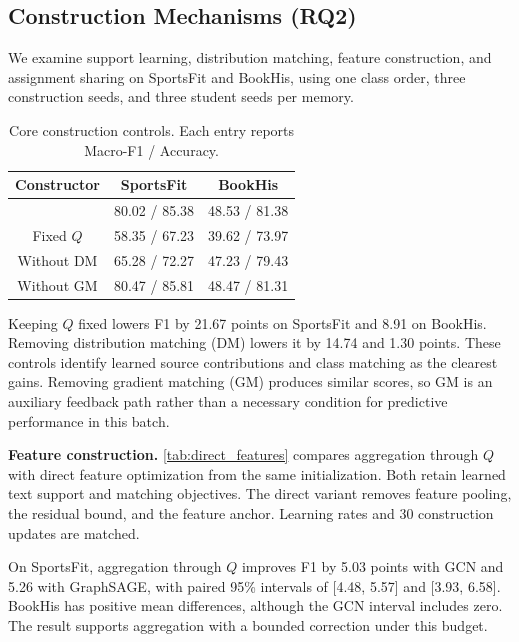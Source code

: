 \subsection{Construction Mechanisms (RQ2)}
\label{sec:ablations}

We examine support learning, distribution matching, feature construction, and assignment sharing on SportsFit and BookHis, using one class order, three construction seeds, and three student seeds per memory.

\begin{table}[t]
\centering
\caption{Core construction controls. Each entry reports Macro-F1 / Accuracy.}
\label{tab:loss_controls}
\begin{tabular}{ccc}
\toprule
Constructor & SportsFit & BookHis\\
\midrule
\method{} & 80.02 / 85.38 & 48.53 / 81.38\\
Fixed \(Q\) & 58.35 / 67.23 & 39.62 / 73.97\\
Without DM & 65.28 / 72.27 & 47.23 / 79.43\\
Without GM & 80.47 / 85.81 & 48.47 / 81.31\\
\bottomrule
\end{tabular}
\end{table}

Keeping \(Q\) fixed lowers F1 by 21.67 points on SportsFit and 8.91 on BookHis. Removing distribution matching (DM) lowers it by 14.74 and 1.30 points. These controls identify learned source contributions and class matching as the clearest gains. Removing gradient matching (GM) produces similar scores, so GM is an auxiliary feedback path rather than a necessary condition for predictive performance in this batch.

\noindent\textbf{Feature construction.}
\autoref{tab:direct_features} compares aggregation through \(Q\) with direct feature optimization from the same initialization. Both retain learned text support and matching objectives. The direct variant removes feature pooling, the residual bound, and the feature anchor. Learning rates and 30 construction updates are matched.

On SportsFit, aggregation through \(Q\) improves F1 by 5.03 points with GCN and 5.26 with GraphSAGE, with paired 95\% intervals of [4.48, 5.57] and [3.93, 6.58]. BookHis has positive mean differences, although the GCN interval includes zero. The result supports aggregation with a bounded correction under this budget.

